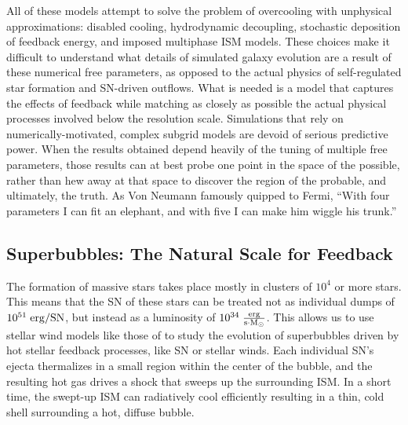 All of these models attempt to solve the problem of overcooling with unphysical
approximations: disabled cooling, hydrodynamic decoupling, stochastic deposition
of feedback energy, and imposed multiphase ISM models.  These choices make it
difficult to understand what details of simulated galaxy evolution are a result
of these numerical free parameters, as opposed to the actual physics of
self-regulated star formation and SN-driven outflows.  What is needed is a model
that captures the effects of feedback while matching as closely as possible the
actual physical processes involved below the resolution scale.  Simulations that
rely on numerically-motivated, complex subgrid models are devoid of serious
predictive power.  When the results obtained depend heavily of the tuning of
multiple free parameters, those results can at best probe one point in the space
of the possible, rather than hew away at that space to discover the region of
the probable, and ultimately, the truth.  As Von Neumann famously quipped to
Fermi, ``With four parameters I can fit an elephant, and with five I can make
him wiggle his trunk.''

\subsection{Superbubbles: The Natural Scale for Feedback}
The formation of massive stars takes place mostly in clusters of $10^4$ or more
stars.  This means that the SN of these stars can be treated not as individual
dumps of $10^{51}\;\rm{erg/SN}$, but instead as a luminosity of
$10^{34}\;\rm{\frac{erg}{s \cdot M_\odot}}$.  This allows us to use stellar wind
models like those of \citet{Weaver1977} to study the evolution of superbubbles driven by
hot stellar feedback processes, like SN or stellar winds.  Each individual SN's
ejecta thermalizes in a small region within the center of the bubble, and the
resulting hot gas drives a shock that sweeps up the surrounding ISM.  In a short
time, the swept-up ISM can radiatively cool efficiently resulting in a thin,
cold shell surrounding a hot, diffuse bubble.

